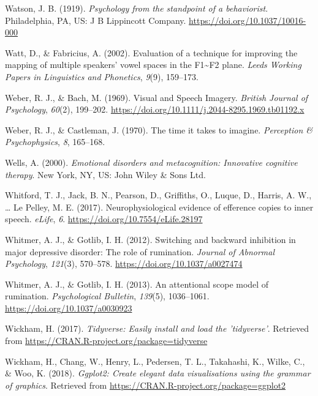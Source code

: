 \documentclass[a4paper,12pt,twoside,openright,oldfontcommands]{memoir}
\begin{document}
\leavevmode\hypertarget{ref-watson_psychology_1919}{}%
Watson, J. B. (1919). \emph{Psychology from the standpoint of a behaviorist}. Philadelphia, PA, US: J B Lippincott Company. \url{https://doi.org/10.1037/10016-000}

\leavevmode\hypertarget{ref-watt_evaluation_2002}{}%
Watt, D., \& Fabricius, A. (2002). Evaluation of a technique for improving the mapping of multiple speakers' vowel spaces in the F1\textasciitilde F2 plane. \emph{Leeds Working Papers in Linguistics and Phonetics}, \emph{9}(9), 159--173.

\leavevmode\hypertarget{ref-weber_visual_1969}{}%
Weber, R. J., \& Bach, M. (1969). Visual and Speech Imagery. \emph{British Journal of Psychology}, \emph{60}(2), 199--202. \url{https://doi.org/10.1111/j.2044-8295.1969.tb01192.x}

\leavevmode\hypertarget{ref-weber_time_1970}{}%
Weber, R. J., \& Castleman, J. (1970). The time it takes to imagine. \emph{Perception \& Psychophysics}, \emph{8}, 165--168.

\leavevmode\hypertarget{ref-wells_emotional_2000}{}%
Wells, A. (2000). \emph{Emotional disorders and metacognition: Innovative cognitive therapy}. New York, NY, US: John Wiley \& Sons Ltd.

\leavevmode\hypertarget{ref-whitford_neurophysiological_2017}{}%
Whitford, T. J., Jack, B. N., Pearson, D., Griffiths, O., Luque, D., Harris, A. W., \ldots{} Le Pelley, M. E. (2017). Neurophysiological evidence of efference copies to inner speech. \emph{eLife}, \emph{6}. \url{https://doi.org/10.7554/eLife.28197}

\leavevmode\hypertarget{ref-whitmer_switching_2012}{}%
Whitmer, A. J., \& Gotlib, I. H. (2012). Switching and backward inhibition in major depressive disorder: The role of rumination. \emph{Journal of Abnormal Psychology}, \emph{121}(3), 570--578. \url{https://doi.org/10.1037/a0027474}

\leavevmode\hypertarget{ref-Whitmer2013}{}%
Whitmer, A. J., \& Gotlib, I. H. (2013). An attentional scope model of rumination. \emph{Psychological Bulletin}, \emph{139}(5), 1036--1061. \url{https://doi.org/10.1037/a0030923}

\leavevmode\hypertarget{ref-R-tidyverse}{}%
Wickham, H. (2017). \emph{Tidyverse: Easily install and load the 'tidyverse'}. Retrieved from \url{https://CRAN.R-project.org/package=tidyverse}

\leavevmode\hypertarget{ref-R-ggplot2}{}%
Wickham, H., Chang, W., Henry, L., Pedersen, T. L., Takahashi, K., Wilke, C., \& Woo, K. (2018). \emph{Ggplot2: Create elegant data visualisations using the grammar of graphics}. Retrieved from \url{https://CRAN.R-project.org/package=ggplot2}
\end{document}
